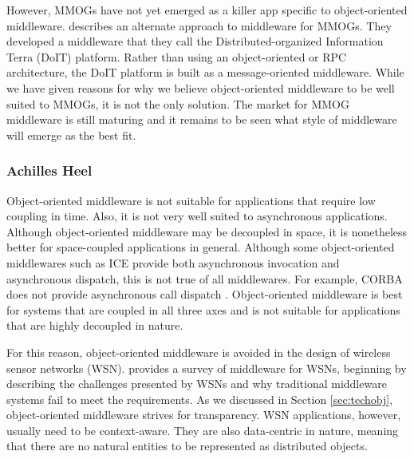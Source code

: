 \documentclass{acm_proc_article-sp}
\begin{document}
However, MMOGs have not yet emerged as a killer app specific to object-oriented middleware.  \cite{Hsiao:2005p8709} describes an alternate approach to middleware for MMOGs.  They developed a middleware that they call the Distributed-organized Information Terra (DoIT) platform.  Rather than using an object-oriented or RPC architecture, the DoIT platform is built as a message-oriented middleware.  While we have given reasons for why we believe object-oriented middleware to be well suited to MMOGs, it is not the only solution.  The market for MMOG middleware is still maturing and it remains to be seen what style of middleware will emerge as the best fit.


\subsubsection{Achilles Heel}
\label{sec:appsobjbad}


Object-oriented middleware is not suitable for applications that require low coupling in time.  Also, it is not very well suited to asynchronous applications.  Although object-oriented middleware may be decoupled in space, it is nonetheless better for space-coupled applications in general.  Although some object-oriented middlewares such as ICE provide both asynchronous invocation and asynchronous dispatch, this is not true of all middlewares.  For example, CORBA does not provide asynchronous call dispatch \cite{Henning:2004p8372}.  Object-oriented middleware is best for systems that are coupled in all three axes and is not suitable for applications that are highly decoupled in nature.

For this reason, object-oriented middleware is avoided in the design of wireless sensor networks (WSN).  \cite{Wang:2008p8370} provides a survey of middleware for WSNs, beginning by describing the challenges presented by WSNs and why traditional middleware systems fail to meet the requirements.  As we discussed in Section \ref{sec:techobj}, object-oriented middleware strives for transparency.  WSN applications, however, usually need to be context-aware.  They are also data-centric in nature, meaning that there are no natural entities to be represented as distributed objects.

\end{document}
